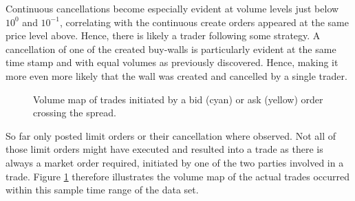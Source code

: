 Continuous cancellations become especially evident at volume levels just below $10^0$ and $10^{-1}$, correlating with the continuous create orders appeared at the same price level above.
Hence, there is likely a trader following some strategy.
A cancellation of one of the created buy-walls is particularly evident at the same time stamp and with equal volumes as previously discovered.
Hence, making it more even more likely that the wall was created and cancelled by a single trader.
\vfill
\pagebreak

\begin{figure}[H]
    \centering
    \caption{Volume map of trades initiated by a bid (cyan) or ask (yellow) order crossing the spread.}
    \label{fig:data-volmap-traded}
\end{figure}

So far only posted limit orders or their cancellation where observed.
Not all of those limit orders might have executed and resulted into a trade as there is always a market order required, initiated by one of the two parties involved in a trade.
Figure \ref{fig:data-volmap-traded} therefore illustrates the volume map of the actual trades occurred within this sample time range of the data set.

